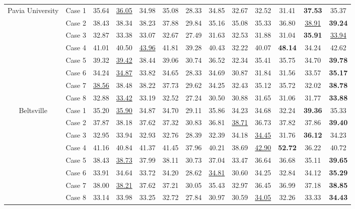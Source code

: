 \begin{table*}[t]
\begin{center}
{\begin{tabular}{cc ccccccccccc}
				\multirow{8}{*}{Pavia University}
				& Case 1 &
				35.64 & \underline{36.05} & 34.98 & 35.08 & 28.33 & 34.85 & 32.67 & 32.52 & 31.41 & \textbf{37.53} & 35.37 \\
				& Case 2 & 
				38.43 & 38.34 & 38.23 & 37.88 & 29.84 & 35.16 & 35.08 & 35.33 & 36.80 & \underline{38.91} & \textbf{39.24} \\
				& Case 3 & 
				32.87 & 33.38 & 33.07 & 32.67 & 27.49 & 31.63 & 32.53 & 31.88 & 31.04 & \textbf{35.91} & \underline{33.94} \\
				& Case 4 &
				41.01 & 40.50 & \underline{43.96} & 41.81 & 39.28 & 40.43 & 32.22 & 40.07 & \textbf{48.14} & 34.24 & 42.62 \\
				& Case 5 & 
				39.32 & \underline{39.42} & 38.44 & 39.06 & 30.74 & 36.52 & 32.34 & 35.41 & 35.75 & 34.70 & \textbf{39.78} \\
				& Case 6 & 
				34.24 & \underline{34.87} & 33.82 & 34.65 & 28.33 & 34.69 & 30.87 & 31.84 & 31.56 & 33.57 & \textbf{35.17} \\
				& Case 7 & 
				\underline{38.56} & 38.48 & 38.22 & 37.73 & 29.62 & 34.25 & 32.43 & 35.12 & 35.72 & 32.02 & \textbf{38.78} \\
				& Case 8 & 
				32.88 & \underline{33.42} & 33.19 & 32.52 & 27.24 & 30.50 & 30.88 & 31.65 & 31.06 & 31.77 & \textbf{33.88} \\
				
				\cmidrule(lr){1-13}
				
				\multirow{8}{*}{Beltsville}
				& Case 1 &
				35.20 & \underline{35.90} & 34.87 & 34.70 & 29.11 & 35.86 & 34.23 & 34.68 & 32.24 & \textbf{39.36} & 35.33 \\
				& Case 2 & 
				37.87 & 38.18 & 37.62 & 37.32 & 30.83 & 36.81 & \underline{38.71} & 36.73 & 37.82 & 37.86 & \textbf{39.40} \\
				& Case 3 & 
				32.95 & 33.94 & 32.93 & 32.76 & 28.39 & 32.39 & 34.18 & \underline{34.45} & 31.76 & \textbf{36.12} & 34.23 \\
				& Case 4 &
				41.16 & 40.84 & 41.37 & 41.45 & 37.96 & 40.21 & 38.69 & \underline{42.90} & \textbf{52.72} & 36.22 & 40.72 \\
				& Case 5 & 
				38.43 & \underline{38.73} & 37.99 & 38.11 & 30.73 & 37.04 & 33.47 & 36.64 & 36.68 & 35.11 & \textbf{39.65} \\
				& Case 6 & 
				33.91 & 34.64 & 33.72 & 34.20 & 28.62 & \underline{34.81} & 30.60 & 34.25 & 32.84 & 34.12 & \textbf{35.29} \\
				& Case 7 & 
				38.00 & \underline{38.21} & 37.62 & 37.21 & 30.05 & 35.43 & 32.97 & 36.45 & 36.99 & 37.18 & \textbf{38.85} \\
				& Case 8 & 
				33.14 & 33.98 & 33.25 & 32.72 & 27.84 & 30.97 & 30.59 & \underline{34.05} & 32.26 & 33.33 & \textbf{34.43} \\
				
				\bottomrule
			\end{tabular}
		}
	\end{center}
\end{table*}